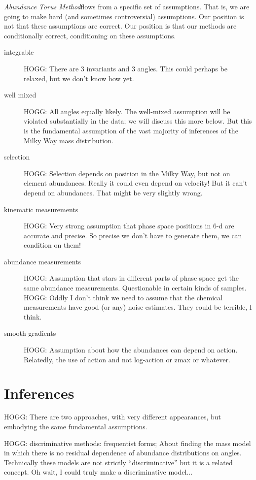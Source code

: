 \documentclass[modern]{aastex63}
\newcommand{\methodname}{\textsl{Abundance Torus Method}}
\begin{document}
\methodname flows from a specific set of assumptions.
That is, we are going to make hard (and sometimes controversial) assumptions.
Our position is not that these assumptions are correct.
Our position is that our
methods are conditionally correct, conditioning on these assumptions.
\begin{description}
\item[integrable] HOGG: There are 3 invariants and 3 angles. This could perhaps be
  relaxed, but we don't know how yet.

\item[well mixed] HOGG: All angles equally likely.
  The well-mixed assumption will be violated substantially in the data;
  we will discuss this more below. But this is the fundamental assumption of
  the vast majority of inferences of the Milky Way mass distribution.

\item[selection] HOGG: Selection depends on position in the Milky Way, but not
  on element abundances. Really it could even depend on velocity! But it can't depend
  on abundances. That might be very slightly wrong.

\item[kinematic measurements] HOGG: Very strong assumption that phase space positions
  in 6-d are accurate and precise. So precise we don't have to generate them, we can
  condition on them!

\item[abundance measurements] HOGG: Assumption that stars in different parts of phase
  space get the same abundance measurements. Questionable in certain kinds of samples.
  HOGG: Oddly I don't think we need to assume that the chemical measurements have good
  (or any) noise estimates. They could be terrible, I think.

\item[smooth gradients] HOGG: Assumption about how the abundances can
  depend on action. Relatedly, the use of action and not log-action
  or zmax or whatever.
\end{description}

\section{Inferences}

HOGG: There are two approaches, with very different appearances, but
embodying the same fundamental assumptions.

HOGG: discriminative methods: frequentist forms; About finding the mass model in which
there is no residual dependence of abundance distributions on angles.
Technically these models are not strictly ``discriminative'' but it is a related
concept. Oh wait, I could truly make a discriminative model...
\end{document}

